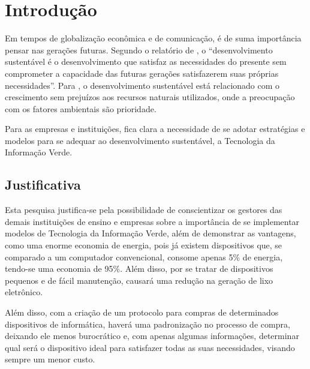 %
%

\chapter{Introdução}\label{chap:introducao}

Em tempos de globalização econômica e de comunicação, é de suma importância pensar nas gerações futuras. Segundo o relatório de , o “desenvolvimento sustentável é o desenvolvimento que satisfaz as necessidades do presente sem comprometer a capacidade das futuras gerações satisfazerem suas próprias necessidades”. 
Para , o desenvolvimento sustentável está relacionado com o crescimento sem prejuízos aos recursos naturais utilizados, onde a preocupação com os fatores ambientais são prioridade. 

Para as empresas e instituições, fica clara a necessidade de se adotar estratégias e modelos para se adequar ao desenvolvimento sustentável, a Tecnologia da Informação Verde.


\section{Justificativa}
Esta pesquisa justifica-se pela possibilidade de conscientizar os gestores das demais instituições de ensino e empresas sobre a importância de se implementar modelos de Tecnologia da Informação Verde, além de demonstrar as vantagens, como uma enorme economia de energia, pois já existem dispositivos que, se comparado a um computador convencional, consome apenas 5\% de energia, tendo-se uma economia de 95\%. Além disso, por se tratar de dispositivos pequenos e de fácil manutenção, causará uma redução na geração de lixo eletrônico.

Além disso, com a criação de um protocolo para compras de determinados dispositivos de informática, haverá uma padronização no processo de compra, deixando ele menos burocrático e, com apenas algumas informações, determinar qual será o dispositivo ideal para satisfazer todas as suas necessidades, visando sempre um menor custo. 

